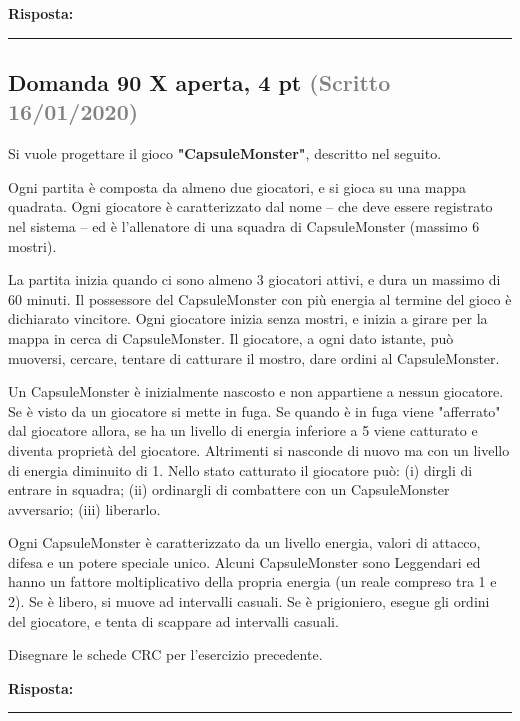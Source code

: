 \documentclass[a4paper,11pt]{article}
\begin{document}
\vspace{0.2cm}
\noindent\textbf{Risposta:}\par
\vspace{4cm}\hrule


\subsection*{Domanda 90 X \hfill {\small aperta, 4 pt \textcolor{gray}{(Scritto 16/01/2020)}}}
\begin{tcolorbox}[colback=gray!8,colframe=gray!50,title=Contesto]
Si vuole progettare il gioco \textbf{"CapsuleMonster"}, descritto nel seguito.

Ogni partita è composta da almeno due giocatori, e si gioca su una mappa quadrata. Ogni giocatore è caratterizzato dal nome – che deve essere registrato nel sistema – ed è l'allenatore di una squadra di CapsuleMonster (massimo 6 mostri).

La partita inizia quando ci sono almeno 3 giocatori attivi, e dura un massimo di 60 minuti. Il possessore del CapsuleMonster con più energia al termine del gioco è dichiarato vincitore. Ogni giocatore inizia senza mostri, e inizia a girare per la mappa in cerca di CapsuleMonster. Il giocatore, a ogni dato istante, può muoversi, cercare, tentare di catturare il mostro, dare ordini al CapsuleMonster.

Un CapsuleMonster è inizialmente nascosto e non appartiene a nessun giocatore. Se è visto da un giocatore si mette in fuga. Se quando è in fuga viene "afferrato" dal giocatore allora, se ha un livello di energia inferiore a 5 viene catturato e diventa proprietà del giocatore. Altrimenti si nasconde di nuovo ma con un livello di energia diminuito di 1. Nello stato catturato il giocatore può: (i) dirgli di entrare in squadra; (ii) ordinargli di combattere con un CapsuleMonster avversario; (iii) liberarlo.

Ogni CapsuleMonster è caratterizzato da un livello energia, valori di attacco, difesa e un potere speciale unico. Alcuni CapsuleMonster sono Leggendari ed hanno un fattore moltiplicativo della propria energia (un reale compreso tra 1 e 2). Se è libero, si muove ad intervalli casuali. Se è prigioniero, esegue gli ordini del giocatore, e tenta di scappare ad intervalli casuali.
\end{tcolorbox}
Disegnare le schede CRC per l'esercizio precedente.

\vspace{0.2cm}
\noindent\textbf{Risposta:}\par
\vspace{4cm}\hrule
\end{document}
